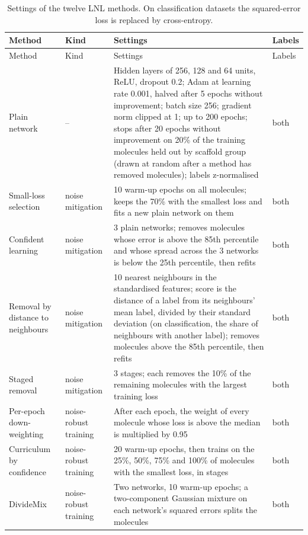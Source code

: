 {\small
\begin{longtable}{@{}p{2.9cm}p{2.0cm}p{7.3cm}p{1.6cm}@{}}
\caption{Settings of the twelve LNL methods. On classification datasets the squared-error loss is replaced by cross-entropy.}
\label{tab:add:lnl_settings}\\
\toprule
Method & Kind & Settings & Labels \\
\midrule
\endfirsthead
\toprule
Method & Kind & Settings & Labels \\
\midrule
\endhead
Plain network & -- & Hidden layers of 256, 128 and 64 units, ReLU, dropout 0.2; Adam at learning rate 0.001, halved after 5 epochs without improvement; batch size 256; gradient norm clipped at 1; up to 200 epochs; stops after 20 epochs without improvement on 20\% of the training molecules held out by scaffold group (drawn at random after a method has removed molecules); labels z-normalised & both \\
\midrule
Small-loss selection & noise mitigation & 10 warm-up epochs on all molecules; keeps the 70\% with the smallest loss and fits a new plain network on them & both \\
Confident learning & noise mitigation & 3 plain networks; removes molecules whose error is above the 85th percentile and whose spread across the 3 networks is below the 25th percentile, then refits & both \\
Removal by distance to neighbours & noise mitigation & 10 nearest neighbours in the standardised features; score is the distance of a label from its neighbours' mean label, divided by their standard deviation (on classification, the share of neighbours with another label); removes molecules above the 85th percentile, then refits & both \\
Staged removal & noise mitigation & 3 stages; each removes the 10\% of the remaining molecules with the largest training loss & both \\
\midrule
Per-epoch down-weighting & noise-robust training & After each epoch, the weight of every molecule whose loss is above the median is multiplied by 0.95 & both \\
Curriculum by confidence & noise-robust training & 20 warm-up epochs, then trains on the 25\%, 50\%, 75\% and 100\% of molecules with the smallest loss, in stages & both \\
DivideMix & noise-robust training & Two networks, 10 warm-up epochs; a two-component Gaussian mixture on each network's squared errors splits the molecules & both \\

\end{longtable}}
